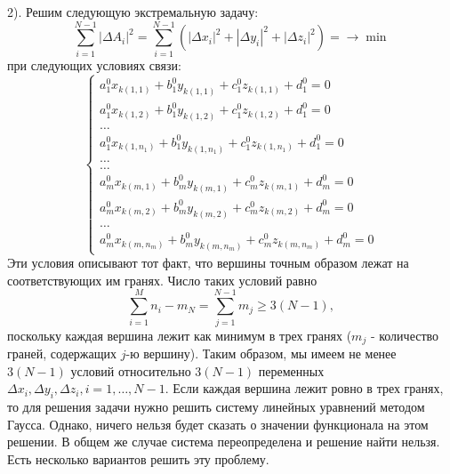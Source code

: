 \documentclass[a4paper,12pt, titlepage]{article}
\begin{document}
	\begin{flushleft}
		2). Решим следующую экстремальную задачу:
		$$
		  \sum\limits_{i = 1}^{N - 1}|\Delta A_{i}|^{2} = \sum\limits_{i = 1}^{N - 1}(|\Delta x_{i}|^{2} + |\Delta y_{i}|^{2} + |\Delta z_{i}|^{2}) = \to \min
		$$
		при следующих условиях связи:
		$$
			\left\{
				\begin{aligned}
					a^{0}_{1} x_{k(1, 1)} + b^{0}_{1} y_{k(1, 1)} + c^{0}_{1} z_{k(1, 1)} + d^{0}_{1} = 0 \\
					a^{0}_{1} x_{k(1, 2)} + b^{0}_{1} y_{k(1, 2)} + c^{0}_{1} z_{k(1, 2)} + d^{0}_{1} = 0 \\
					\ldots \\
					a^{0}_{1} x_{k(1, n_{1})} + b^{0}_{1} y_{k(1, n_{1})} + c^{0}_{1} z_{k(1, n_{1})} + d^{0}_{1} = 0 \\
					\ldots \\
					\ldots \\
					a^{0}_{m} x_{k(m, 1)} + b^{0}_{m} y_{k(m, 1)} + c^{0}_{m} z_{k(m, 1)} + d^{0}_{m} = 0 \\
					a^{0}_{m} x_{k(m, 2)} + b^{0}_{m} y_{k(m, 2)} + c^{0}_{m} z_{k(m, 2)} + d^{0}_{m} = 0 \\
					\ldots \\
					a^{0}_{m} x_{k(m, n_{m})} + b^{0}_{m} y_{k(m, n_{m})} + c^{0}_{m} z_{k(m, n_{m})} + d^{0}_{m} = 0
				\end{aligned}
			\right.
		$$
		Эти условия описывают тот факт, что вершины точным образом лежат на соответствующих им гранях.
		Число таких условий равно 
		$$
			\sum\limits_{i = 1}^{M}n_{i} - m_{N} = \sum\limits_{j = 1}^{N - 1}m_{j} \ge 3 (N - 1),
		$$
		поскольку каждая вершина лежит как минимум в трех гранях ($m_{j}$ - количество граней, содержащих $j$-ю
		вершину). Таким образом, мы имеем не менее $3 (N - 1)$ 
		условий относительно $3 (N - 1)$ переменных 
		$\Delta x_{i}, \Delta y_{i}, \Delta z_{i}, i = 1, \ldots, N - 1$. Если каждая вершина лежит ровно в трех 
		гранях, то для решения задачи нужно решить систему линейных уравнений методом Гаусса. Однако, ничего нельзя
		будет сказать о значении функционала на этом решении. В общем же случае система переопределена и решение
		найти нельзя. Есть несколько вариантов решить эту проблему.
	\end{flushleft}
\end{document}
